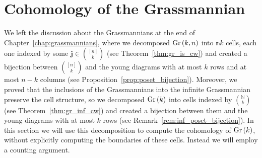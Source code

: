 \section{Cohomology of the Grassmannian}
We left the discussion about the Grassmannians at the end of Chapter~\ref{chap:grassmannians}, where we decomposed $\Gr{k}{n}$ into $\mathbb{n}{k}$ cells, each one indexed by some $\mathbf{j}\in\binom{[n]}{k}$ (see Theorem~\ref{thm:gr_is_cw}) and created a bijection between $\binom{[n]}{k}$ and the young diagrams with at most $k$ rows and at most $n-k$ columns (see Proposition~\ref{prop:poset_bijection}). Moreover, we proved that the inclusions of the Grassmannians into the infinite Grassmannian preserve the cell structure, so we decomposed $\Gr{k}$ into cells indexed by $\binom{\mathbb{N}}{k}$ (see Theorem~\ref{thm:gr_inf_cw}) and created a bijection between them and the young diagrams with at most $k$ rows (see Remark~\ref{rem:inf_poset_bijection}). In this section we will use this decomposition to compute the cohomology of $\Gr{k}$, without explicitly computing the boundaries of these cells. Instead we will employ a counting argument.

